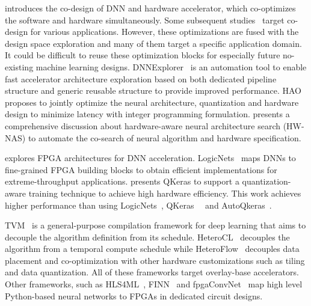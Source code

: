\cite{hao2018deep} introduces the co-design of DNN and hardware accelerator, which co-optimizes the software and hardware simultaneously. Some subsequent studies~\cite{hao2019fpga, hao2019nais, yang2019synetgy, hao2020effective, jiang2020hardware, dong2021hao,  hao2021enabling, zhang2022algorithm} target co-design for various applications. However, these optimizations are fused with the design space exploration and many of them target a specific application domain. It could be difficult to reuse these optimization blocks for especially future no-existing machine learning designs. 
DNNExplorer~\cite{zhang2020dnnexplorer} is an automation tool to enable fast accelerator architecture exploration based on both dedicated pipeline structure and generic reusable structure to provide improved performance. 
HAO~\cite{dong2021hao} proposes to jointly optimize the neural architecture, quantization and hardware design to minimize latency with integer programming formulation. 
\cite{chitty2022neural} presents a comprehensive discussion about hardware-aware neural architecture search (HW-NAS) to automate the co-search of neural algorithm and hardware specification. 

\cite{roorda2022fpga} explores FPGA architectures for DNN acceleration. 
LogicNets~\cite{umuroglu2020logicnets} maps DNNs to fine-grained FPGA building blocks to obtain efficient implementations for extreme-throughput applications. \cite{coelho2021automatic} presents QKeras to support a quantization-aware training technique to achieve high hardware efficiency. This work achieves higher performance than using LogicNets~\cite{umuroglu2020logicnets},  QKeras~~\cite{umuroglu2020logicnets} and AutoQkeras~\cite{umuroglu2020logicnets}. 

TVM~\cite{chen2018tvm} is a general-purpose compilation framework for deep learning that aims to decouple the algorithm definition from its schedule. HeteroCL~\cite{lai2019heterocl} decouples the algorithm from a temporal compute schedule while HeteroFlow~\cite{xiang2022heteroflow} decouples data placement and co-optimization with other hardware customizations such as tiling and data quantization. All of these frameworks target overlay-base accelerators. Other frameworks, such as HLS4ML~\cite{duarte2018fast}, FINN~\cite{umuroglu2017finn} and fpgaConvNet~\cite{venieris2016fpgaconvnet} map high level Python-based neural networks to FPGAs in dedicated circuit designs.  

